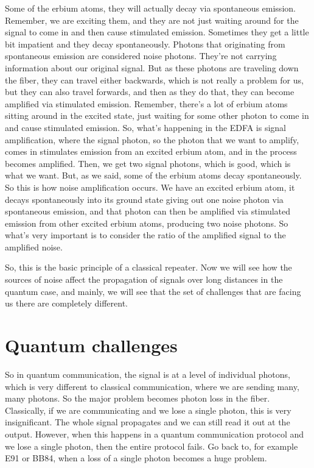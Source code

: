 Some of the erbium atoms, they will actually decay via spontaneous emission. Remember, we are exciting them, and they are not just waiting around for the signal to come in and then cause stimulated emission. Sometimes they get a little bit impatient and they decay spontaneously. Photons that originating from spontaneous emission are considered noise photons. They're not carrying information about our original signal. But as these photons are traveling down the fiber, they can travel either backwards, which is not really a problem for us, but they can also travel forwards, and then as they do that, they can become amplified via stimulated emission. Remember, there's a lot of erbium atoms sitting around in the excited state, just waiting for some other photon to come in and cause stimulated emission. So, what's happening in the EDFA is signal amplification, where the signal photon, so the photon that we want to amplify, comes in stimulates emission from an excited erbium atom, and in the process becomes amplified. Then, we get two signal photons, which is good, which is what we want. But, as we said, some of the erbium atoms decay spontaneously. So this is how noise amplification occurs. We have an excited erbium atom, it decays spontaneously into its ground state giving out one noise photon via spontaneous emission, and that photon can then be amplified via stimulated emission from other excited erbium atoms, producing two noise photons. So what's very important is to consider the ratio of the amplified signal to the amplified noise.

So, this is the basic principle of a classical repeater. Now we will see how the sources of noise affect the propagation of signals over long distances in the quantum case, and mainly, we will see that the set of challenges that are facing us there are completely different.



\section{Quantum challenges}

So in quantum communication, the signal is at a level of individual photons, which is very different to classical communication, where we are sending many, many photons. So the major problem becomes photon loss in the fiber. Classically, if we are communicating and we lose a single photon, this is very insignificant. The whole signal propagates and we can still read it out at the output. However, when this happens in a quantum communication protocol and we lose a single photon, then the entire protocol fails. Go back to, for example E91 or BB84, when a loss of a single photon becomes a huge problem.

